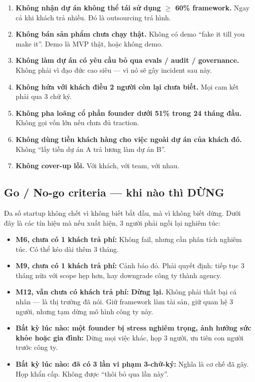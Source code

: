 \documentclass[11pt,a4paper]{article}
\begin{document}
\begin{enumerate}
\item \textbf{Không nhận dự án không thể tái sử dụng $\geq$ 60\% framework.}
Ngay cả khi khách trả nhiều. Đó là outsourcing trá hình.

\item \textbf{Không bán sản phẩm chưa chạy thật.} Không có demo ``fake it till
you make it''. Demo là MVP thật, hoặc không demo.

\item \textbf{Không làm dự án có yêu cầu bỏ qua evals / audit / governance.}
Không phải vì đạo đức cao siêu --- vì nó sẽ gây incident sau này.

\item \textbf{Không hứa với khách điều 2 người còn lại chưa biết.} Mọi cam kết
phải qua 3 chữ ký.

\item \textbf{Không pha loãng cổ phần founder dưới 51\% trong 24 tháng đầu.}
Không gọi vốn lớn nếu chưa đủ traction.

\item \textbf{Không dùng tiền khách hàng cho việc ngoài dự án của khách đó.}
Không ``lấy tiền dự án A trả lương làm dự án B''.

\item \textbf{Không cover-up lỗi.} Với khách, với team, với nhau.
\end{enumerate}

\subsection{Go / No-go criteria --- khi nào thì DỪNG}

\begin{warnbox}[title=Đây là phần khó nhất]
Đa số startup không chết vì không biết bắt đầu, mà vì không biết dừng. Dưới đây
là các tín hiệu mà nếu xuất hiện, 3 người phải ngồi lại nghiêm túc:
\end{warnbox}

\begin{itemize}
\item \textbf{M6, chưa có 1 khách trả phí:} Không fail, nhưng cần phân tích nghiêm
túc. Có thể kéo dài thêm 3 tháng.

\item \textbf{M9, chưa có 1 khách trả phí:} Cảnh báo đỏ. Phải quyết định:
tiếp tục 3 tháng nữa với scope hẹp hơn, hay downgrade công ty thành agency.

\item \textbf{M12, vẫn chưa có khách trả phí:} \textbf{Dừng lại.} Không phải
thất bại cá nhân --- là thị trường đã nói. Giữ framework làm tài sản, giữ quan
hệ 3 người, nhưng tạm dừng mô hình công ty này.

\item \textbf{Bất kỳ lúc nào: một founder bị stress nghiêm trọng, ảnh hưởng sức
khỏe hoặc gia đình:} Dừng mọi việc khác, họp 3 người, ưu tiên con người trước công ty.

\item \textbf{Bất kỳ lúc nào: đã có 3 lần vi phạm 3-chữ-ký:} Nghĩa là cơ chế đã
gãy. Họp khẩn cấp. Không được ``thôi bỏ qua lần này''.
\end{itemize}
\end{document}
